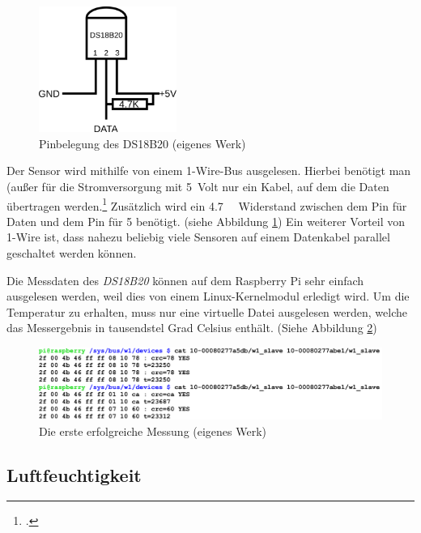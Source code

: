 \begin{figure}[h]
  \centering
     \includegraphics[width=0.4\textwidth]{figures/temp_pin.png}
  \caption{Pinbelegung des DS18B20 (eigenes Werk)}
  \label{fig:temp_pin}
\end{figure}

Der Sensor wird mithilfe von einem \gls{1-Wire}-\gls{Bus} ausgelesen. Hierbei benötigt man (außer für die Stromversorgung mit \SI{5}{\gls{Volt}} nur ein Kabel, auf dem die Daten übertragen werden.\footcite{1-wire} Zusätzlich wird ein \SI{4.7}{\kilo{}} Widerstand zwischen dem Pin für Daten und dem Pin für \SI[retain-explicit-plus]{+5}{} benötigt. (siehe Abbildung \ref{fig:temp_pin})
Ein weiterer Vorteil von 1-Wire ist, dass nahezu beliebig viele Sensoren auf einem Datenkabel parallel geschaltet werden können.

Die Messdaten des \emph{DS18B20} können auf dem Raspberry Pi sehr einfach ausgelesen werden, weil dies von einem Linux-\gls{Kernelmodul} erledigt wird. Um die Temperatur zu erhalten, muss  nur eine virtuelle Datei ausgelesen werden, welche das Messergebnis in tausendstel Grad Celsius enthält. (Siehe Abbildung \ref{fig:temp_screenshot})

\begin{figure}[h]
  \centering
     \includegraphics[width=\textwidth]{figures/temp_screenshot.png}
  \caption{Die erste erfolgreiche Messung (eigenes Werk)}
  \label{fig:temp_screenshot}
\end{figure}

\subsection{Luftfeuchtigkeit}
\label{subsec:Luftfeuchtigkeit}

